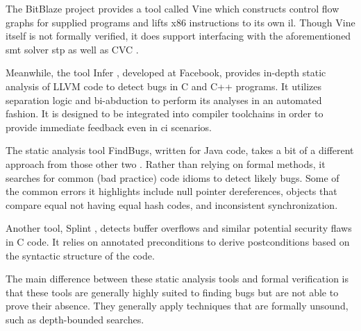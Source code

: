 The BitBlaze project  \autocite{song2008bitblaze,BitBlazeWebSite}
provides a tool called Vine which constructs control flow graphs
for supplied programs and lifts x86 instructions to its own \ac{il}.
Though Vine itself is not formally verified,
it does support interfacing with the aforementioned \ac{smt} solver \ac{stp}
as well as CVC \autocite{barrett2004cvcl,barrett2007cvc3}.

Meanwhile, the tool Infer \autocite{calcagno2011infer}, developed at Facebook,
provides in-depth static analysis of LLVM code to detect bugs in C and C++ programs.
It utilizes separation logic  \autocite{reynolds2002separation}
and bi-abduction to perform its analyses in an automated fashion.
It is designed to be integrated into compiler toolchains
in order to provide immediate feedback even in \ac{ci} scenarios.

The static analysis tool FindBugs, written for Java code,
takes a bit of a different approach from those other two \autocite{hovemeyer2004findbugs}.
Rather than relying on formal methods,
it searches for common (bad practice) code idioms to detect likely bugs.
Some of the common errors it highlights include null pointer dereferences,
objects that compare equal not having equal hash codes,
and inconsistent synchronization.

Another tool, Splint \autocite{evans2002static}, detects buffer overflows
and similar potential security flaws in C code.
It relies on annotated preconditions to derive postconditions
based on the syntactic structure of the code.

The main difference between these static analysis tools and formal verification
is that these tools are generally highly suited to finding bugs
but are not able to prove their absence.
They generally apply techniques that are formally unsound, such as depth-bounded searches.


